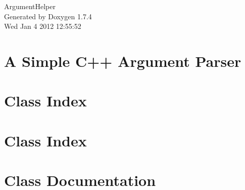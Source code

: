 \documentclass[a4paper]{book}
\begin{document}
\hypersetup{pageanchor=false}
\begin{titlepage}
\vspace*{7cm}
\begin{center}
{\Large ArgumentHelper }\\
\vspace*{1cm}
{\large Generated by Doxygen 1.7.4}\\
\vspace*{0.5cm}
{\small Wed Jan 4 2012 12:55:52}\\
\end{center}
\end{titlepage}
\clearemptydoublepage
{}
\tableofcontents
\clearemptydoublepage
{}
\hypersetup{pageanchor=true}
\chapter{A Simple C++ Argument Parser}
\label{index}\hypertarget{index}{}
\chapter{Class Index}

\chapter{Class Index}

\chapter{Class Documentation}









\printindex
\end{document}
